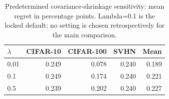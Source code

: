 \begin{table}[tb]\centering\small
\caption{Predetermined covariance-shrinkage sensitivity: mean regret in percentage points. Lambda=0.1 is the locked default; no setting is chosen retrospectively for the main comparison.}\label{tab:shrinkage}
\begin{tabular}{lrrrr}\toprule
$\lambda$ & CIFAR-10 & CIFAR-100 & SVHN & Mean\\\midrule
0.01 & 0.249 & 0.078 & 0.240 & 0.189\\
0.1 & 0.249 & 0.174 & 0.240 & 0.221\\
0.5 & 0.239 & 0.202 & 0.240 & 0.227\\
\bottomrule\end{tabular}
\end{table}
